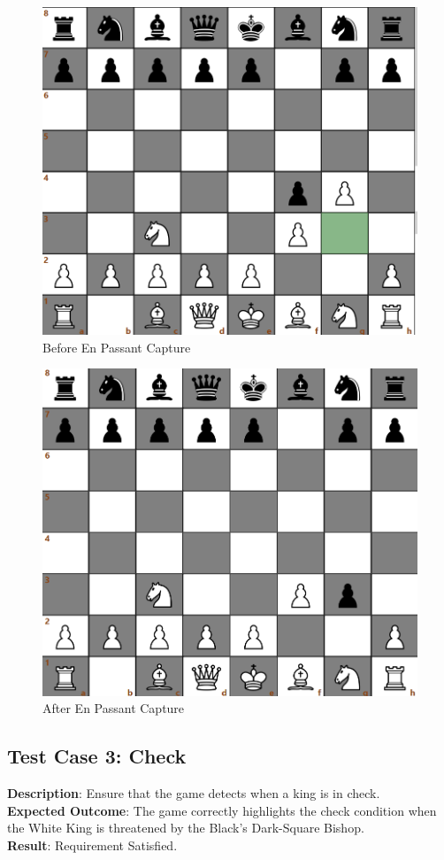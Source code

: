 \documentclass[a4paper,12pt]{article}
\begin{document}
\begin{figure}[H]
    \centering
    \includegraphics[width=0.7\linewidth]{Images/Test Cases/testCase2Img2.png}
    \caption{Before En Passant Capture}
    \label{fig:BeforeEnPassant}
\end{figure}

\begin{figure}[H]
    \centering
    \includegraphics[width=0.7\linewidth]{Images/Test Cases/testCase2Img3.png}
    \caption{After En Passant Capture}
    \label{fig:AfterEnPassant}
\end{figure}

\subsection{Test Case 3: Check}
\textbf{Description}: Ensure that the game detects when a king is in check.\\
\textbf{Expected Outcome}: The game correctly highlights the check condition when the White King is threatened by the Black's Dark-Square Bishop.\\
\textbf{Result}: Requirement Satisfied.
\end{document}
